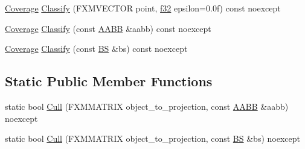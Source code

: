 \begin{DoxyCompactItemize}
\item 
\hyperlink{namespacemage_aa9fe157e5a578a103160266df8cccb0a}{Coverage} \hyperlink{structmage_1_1_view_frustum_a1f529019d8a130192401e5b4658dbb51}{Classify} (F\+X\+M\+V\+E\+C\+T\+OR point, \hyperlink{namespacemage_a6a44ad388483959dc4dff9f2aef91431}{f32} epsilon=0.\+0f) const noexcept
\item 
\hyperlink{namespacemage_aa9fe157e5a578a103160266df8cccb0a}{Coverage} \hyperlink{structmage_1_1_view_frustum_a2c8ac9e080897aa02902d383e64a50e7}{Classify} (const \hyperlink{structmage_1_1_a_a_b_b}{A\+A\+BB} \&aabb) const noexcept
\item 
\hyperlink{namespacemage_aa9fe157e5a578a103160266df8cccb0a}{Coverage} \hyperlink{structmage_1_1_view_frustum_ad614c4948b6a99174d9aeac5dd5825f5}{Classify} (const \hyperlink{structmage_1_1_b_s}{BS} \&bs) const noexcept
\end{DoxyCompactItemize}
\subsection*{Static Public Member Functions}
\begin{DoxyCompactItemize}
\item 
static bool \hyperlink{structmage_1_1_view_frustum_a426fbed6bc71bd195edda01e5c3b2c3f}{Cull} (F\+X\+M\+M\+A\+T\+R\+IX object\+\_\+to\+\_\+projection, const \hyperlink{structmage_1_1_a_a_b_b}{A\+A\+BB} \&aabb) noexcept
\item 
static bool \hyperlink{structmage_1_1_view_frustum_ae07812a46d8c5058267a35b154b603c5}{Cull} (F\+X\+M\+M\+A\+T\+R\+IX object\+\_\+to\+\_\+projection, const \hyperlink{structmage_1_1_b_s}{BS} \&bs) noexcept
\end{DoxyCompactItemize}
